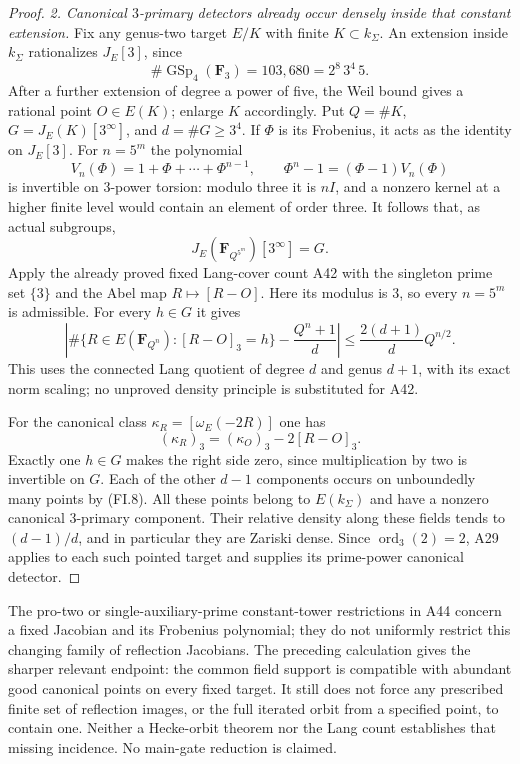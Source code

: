 \documentclass[11pt,a4paper]{article}
\begin{document}
\begin{proof}
\emph{2. Canonical $3$-primary detectors already occur densely inside
that constant extension.}
Fix any genus-two target $E/K$ with finite $K\subset k_\Sigma$.
An extension inside $k_\Sigma$ rationalizes $J_E[3]$, since
\[
 \#\operatorname{GSp}_4(\mathbf F_3)
       =103{,}680=2^8\,3^4\,5.
 \tag{FI.5}
\]
After a further extension of degree a power of five, the Weil
bound gives a rational point $O\in E(K)$; enlarge $K$ accordingly.
Put $Q=\#K$, $G=J_E(K)[3^\infty]$, and $d=\#G\ge3^4$.
If $\Phi$ is its Frobenius, it acts as the identity on $J_E[3]$.
For $n=5^m$ the polynomial
\[
  V_n(\Phi)=1+\Phi+\cdots+\Phi^{n-1},\qquad
  \Phi^n-1=(\Phi-1)V_n(\Phi)
 \tag{FI.6}
\]
is invertible on $3$-power torsion: modulo three it is $nI$,
and a nonzero kernel at a higher finite level would contain an
element of order three. It follows that, as actual subgroups,
\[
                  J_E(\mathbf F_{Q^{5^m}})[3^\infty]=G.
 \tag{FI.7}
\]
Apply the already proved fixed Lang-cover count A42 with the
singleton prime set $\{3\}$ and the Abel map $R\mapsto[R-O]$.
Here its modulus is $3$, so every $n=5^m$ is admissible. For
every $h\in G$ it gives
\[
 \left|\#\{R\in E(\mathbf F_{Q^n}):[R-O]_3=h\}
                 -\frac{Q^n+1}{d}\right|
       \le\frac{2(d+1)}d Q^{n/2}.
 \tag{FI.8}
\]
This uses the connected Lang quotient of degree $d$ and genus
$d+1$, with its exact norm scaling; no unproved density
principle is substituted for A42.

For the canonical class $\kappa_R=[\omega_E(-2R)]$ one has
\[
             (\kappa_R)_3=(\kappa_O)_3-2[R-O]_3.
 \tag{FI.9}
\]
Exactly one $h\in G$ makes the right side zero, since
multiplication by two is invertible on $G$. Each of the other
$d-1$ components occurs on unboundedly many points by (FI.8).
All these points belong to $E(k_\Sigma)$ and have a nonzero
canonical $3$-primary component. Their relative density along
these fields tends to $(d-1)/d$, and in particular they are
Zariski dense. Since $\operatorname{ord}_3(2)=2$, A29 applies
to each such pointed target and supplies its prime-power
canonical detector.
\end{proof}

The pro-two or single-auxiliary-prime constant-tower restrictions
in A44 concern a fixed Jacobian and its Frobenius polynomial;
they do not uniformly restrict this changing family of reflection
Jacobians. The preceding calculation gives the sharper relevant
endpoint: the common field support is compatible with abundant
good canonical points on every fixed target. It still does not
force any prescribed finite set of reflection images, or the
full iterated orbit from a specified point, to contain one.
Neither a Hecke-orbit theorem nor the Lang count establishes
that missing incidence. No main-gate reduction is claimed.
\end{document}
